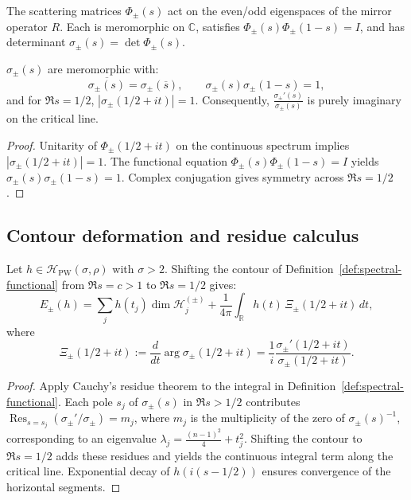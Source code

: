 \begin{remark}
\label{rem:parity-scattering}
The scattering matrices $\Phi_\pm(s)$ act on the even/odd eigenspaces of the mirror operator $R$.  
Each is meromorphic on $\mathbb{C}$, satisfies $\Phi_\pm(s)\Phi_\pm(1-s)=I$, and has determinant $\sigma_\pm(s)=\det \Phi_\pm(s)$. %
\end{remark}

\begin{lemma}
\label{lem:sigma-analytic}
$\sigma_\pm(s)$ are meromorphic with:
\[
\overline{\sigma_\pm(s)}=\sigma_\pm(\overline{s}),\qquad
\sigma_\pm(s)\sigma_\pm(1-s)=1,
\]
and for $\Re s=1/2$, $|\sigma_\pm(1/2+it)|=1$.  
Consequently, $\frac{\sigma_\pm'(s)}{\sigma_\pm(s)}$ is purely imaginary on the critical line. %
\end{lemma}

\begin{proof}
Unitarity of $\Phi_\pm(1/2+it)$ on the continuous spectrum implies $|\sigma_\pm(1/2+it)|=1$.  
The functional equation $\Phi_\pm(s)\Phi_\pm(1-s)=I$ yields $\sigma_\pm(s)\sigma_\pm(1-s)=1$.  
Complex conjugation gives symmetry across $\Re s=1/2$. %
\end{proof}

\subsection{Contour deformation and residue calculus}
\label{subsec:ch6-part4-contour} \relax

\begin{theorem}
\label{thm:contour-deform}
Let $h\in\mathcal{H}_{\mathrm{PW}}(\sigma,\rho)$ with $\sigma>2$.  
Shifting the contour of Definition~\ref{def:spectral-functional} from $\Re s=c>1$ to $\Re s=1/2$ gives:
\[
E_\pm(h)
=\sum_j h(t_j)\dim\mathcal{H}_j^{(\pm)}
+\frac{1}{4\pi}\int_{\mathbb{R}}h(t)\,\Xi_\pm(1/2+it)\,dt,
\]
where
\[
\Xi_\pm(1/2+it)
:=\frac{d}{dt}\arg\sigma_\pm(1/2+it)
=\frac{1}{i}\frac{\sigma_\pm'(1/2+it)}{\sigma_\pm(1/2+it)}.
\] %
\end{theorem}

\begin{proof}
Apply Cauchy’s residue theorem to the integral in Definition~\ref{def:spectral-functional}.  
Each pole $s_j$ of $\sigma_\pm(s)$ in $\Re s>1/2$ contributes $\operatorname*{Res}_{s=s_j}(\sigma_\pm'/\sigma_\pm)=m_j$, where $m_j$ is the multiplicity of the zero of $\sigma_\pm(s)^{-1}$, corresponding to an eigenvalue $\lambda_j=\tfrac{(n-1)^2}{4}+t_j^2$.  
Shifting the contour to $\Re s=1/2$ adds these residues and yields the continuous integral term along the critical line.  
Exponential decay of $h(i(s-1/2))$ ensures convergence of the horizontal segments. %
\end{proof}

